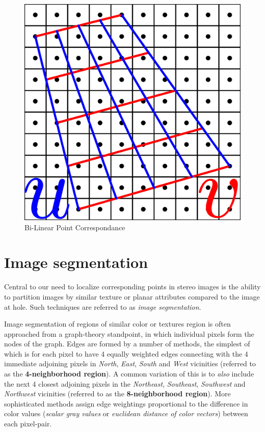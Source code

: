 \documentclass[12pt]{report}
\begin{document}
\begin{figure}[htbp]
	\centering
%	
	\includegraphics[scale=0.25]{BiLinear_Point_Correspondance_v1}
	\caption{Bi-Linear Point Correspondance}
\end{figure}

\chapter{Image segmentation}
\par Central to our need to localize corresponding points in stereo images is the ability to partition images by similar texture or planar attributes compared to the image at hole. Such techniques are referred to as \textit{image segmentation}. 
\par Image segmentation of regions of similar color or textures region is often approached from a graph-theory standpoint, in which individual pixels form the nodes of the graph. Edges are formed by a number of methods, the simplest of which is for each pixel to have 4 equally weighted edges connecting with the 4 immediate adjoining pixels in \textit{North}, \textit{East}, \textit{South} and \textit{West} vicinities (referred to as the \textbf{4-neighborhood region}). A common variation of this is to \textit{also} include the next 4 closest adjoining pixels in the \textit{Northeast}, \textit{Southeast}, \textit{Southwest} and \textit{Northwest} vicinities (referred to as the \textbf{8-neighborhood region}). More sophisticated methods assign edge weightings proportional to the difference in color values (\textit{scalar gray values} or \textit{euclidean distance of color vectors}) between each pixel-pair.
\end{document}
